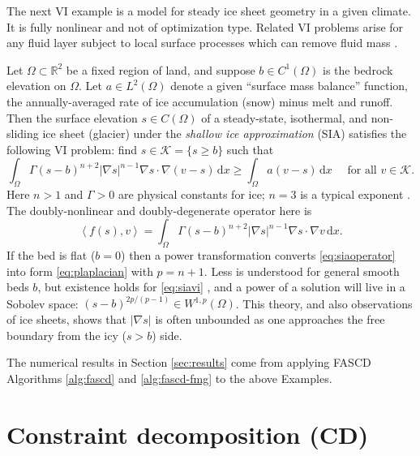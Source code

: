 \documentclass[review,hidelinks,onefignum,onetabnum,final]{siamart220329}  %
\newcommand{\RR}{\mathbb{R}}
\newcommand{\grad}{\nabla}
\newcommand{\ip}[2]{\left<#1,#2\right>}
\newcommand{\dx}{\, \mathrm{d}x}
\begin{document}
The next VI example is a model for steady ice sheet geometry in a given climate.  It is fully nonlinear and not of optimization type.  Related VI problems arise for any fluid layer subject to local surface processes which can remove fluid mass \cite{Bueler2021conservation}.

\begin{example}  \label{ex:sia}  Let $\Omega \subset \RR^2$ be a fixed region of land, and suppose $b \in C^1(\Omega)$ is the bedrock elevation on $\Omega$.  Let $a \in L^2(\Omega)$ denote a given ``surface mass balance'' function, the annually-averaged rate of ice accumulation (snow) minus melt and runoff.  Then the surface elevation $s\in C(\Omega)$ of a steady-state, isothermal, and non-sliding ice sheet (glacier) under the \emph{shallow ice approximation} (SIA) \cite{GreveBlatter2009} satisfies the following VI problem: find $s \in \mathcal{K} = \{s\ge b\}$ such that
\begin{equation}
\int_\Omega \Gamma (s-b)^{n+2} |\grad s|^{n-1} \grad s \cdot \grad (v-s) \dx \ge \int_\Omega a (v-s)\dx \quad \text{ for all } v \in \mathcal{K}. \label{eq:siavi}
\end{equation}
Here $n>1$ and $\Gamma>0$ are physical constants for ice; $n=3$ is a typical exponent \cite{GreveBlatter2009}.  The doubly-nonlinear and doubly-degenerate operator here is
\begin{equation}
\ip{f(s)}{v} = \int_\Omega \Gamma (s-b)^{n+2} |\grad s|^{n-1} \grad s \cdot \grad v\dx. \label{eq:siaoperator}
\end{equation}
If the bed is flat ($b=0$) then a power transformation converts \eqref{eq:siaoperator} into form \eqref{eq:plaplacian} with $p=n+1$.  Less is understood for general smooth beds $b$, but existence holds for \eqref{eq:siavi} \cite{JouvetBueler2012}, and a power of a solution will live in a Sobolev space: $(s-b)^{2p/(p-1)} \in W^{1,p}(\Omega)$.  This theory, and also observations of ice sheets, shows that $|\grad s|$ is often unbounded as one approaches the free boundary from the icy ($s>b$) side.
\end{example}

The numerical results in Section \ref{sec:results} come from applying FASCD Algorithms \ref{alg:fascd} and \ref{alg:fascd-fmg} to the above Examples.


\section{Constraint decomposition (CD)} \label{sec:cd}
\end{document}

